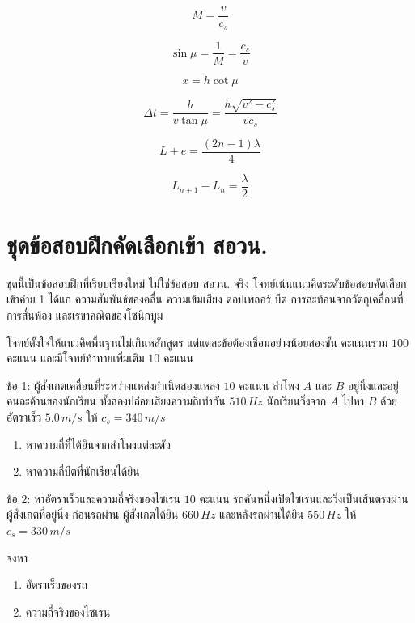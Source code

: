 \begin{tcolorbox}[title={โซนิกบูมและกรวยมัค}]
\[
\boxed{M=\frac{v}{c_s}}
\]

\[
\boxed{\sin\mu=\frac{1}{M}=\frac{c_s}{v}}
\]

\[
\boxed{x=h\cot\mu}
\]

\[
\boxed{
\Delta t
=\frac{h}{v\tan\mu}
=\frac{h\sqrt{v^2-c_s^2}}{vc_s}
}
\]
\end{tcolorbox}

\begin{tcolorbox}[title={ท่อปิดหนึ่งปลาย}]
\[
\boxed{L+e=\frac{(2n-1)\lambda}{4}}
\]

\[
\boxed{L_{n+1}-L_n=\frac{\lambda}{2}}
\]
\end{tcolorbox}

\section{ชุดข้อสอบฝึกคัดเลือกเข้า สอวน.}

\begin{tcolorbox}[title={คำชี้แจง}]
ชุดนี้เป็นข้อสอบฝึกที่เรียบเรียงใหม่ ไม่ใช่ข้อสอบ สอวน. จริง โจทย์เน้นแนวคิดระดับข้อสอบคัดเลือกเข้าค่าย 1 ได้แก่ ความสัมพันธ์ของคลื่น ความเข้มเสียง ดอปเพลอร์ บีต การสะท้อนจากวัตถุเคลื่อนที่ การสั่นพ้อง และเรขาคณิตของโซนิกบูม

โจทย์ตั้งใจให้แนวคิดพื้นฐานไม่เกินหลักสูตร แต่แต่ละข้อต้องเชื่อมอย่างน้อยสองขั้น คะแนนรวม $100$ คะแนน และมีโจทย์ท้าทายเพิ่มเติม $10$ คะแนน
\end{tcolorbox}

\begin{exercisebox}{ข้อ 1: ผู้สังเกตเคลื่อนที่ระหว่างแหล่งกำเนิดสองแหล่ง $10$ คะแนน}
ลำโพง $A$ และ $B$ อยู่นิ่งและอยู่คนละด้านของนักเรียน ทั้งสองปล่อยเสียงความถี่เท่ากัน $510\,\si{Hz}$ นักเรียนวิ่งจาก $A$ ไปหา $B$ ด้วยอัตราเร็ว $5.0\,\si{m/s}$ ให้ $c_s=340\,\si{m/s}$

\begin{enumerate}[label=(\alph*)]
    \item หาความถี่ที่ได้ยินจากลำโพงแต่ละตัว
    \item หาความถี่บีตที่นักเรียนได้ยิน
\end{enumerate}
\end{exercisebox}

\begin{exercisebox}{ข้อ 2: หาอัตราเร็วและความถี่จริงของไซเรน $10$ คะแนน}
รถคันหนึ่งเปิดไซเรนและวิ่งเป็นเส้นตรงผ่านผู้สังเกตที่อยู่นิ่ง ก่อนรถผ่าน ผู้สังเกตได้ยิน $660\,\si{Hz}$ และหลังรถผ่านได้ยิน $550\,\si{Hz}$ ให้ $c_s=330\,\si{m/s}$

จงหา

\begin{enumerate}[label=(\alph*)]
    \item อัตราเร็วของรถ
    \item ความถี่จริงของไซเรน
\end{enumerate}
\end{exercisebox}

